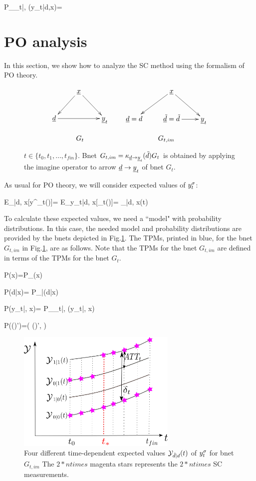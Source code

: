 \beq\color{blue}
P_{\rvy_t|\rvd, \rvx}(y_t|d,x)=
\eeq

\section{PO analysis}
In this section,
we show how
to analyze the
SC method
using the formalism of PO theory.



\begin{figure}[h!]
$$
\begin{array}{ccccc}
\xymatrix{
&\rvx\ar[dl]\ar[dr]
\\
\rvd\ar[rr]&&\rvy_t
}
&&
\xymatrix{
&\rvx\ar[dl]\ar[dr]
\\
\rvd=d&\rvtd=\td\ar[r]&\rvy_t
}
\\
\\
G_t&&G_{t, im}
\end{array}
$$
\caption{$t\in \{t_0, t_1, \ldots, 
t_{fin}\}$.
Bnet 
$G_{t, im}= \kappa_{{\underline{d}}\rightarrow{\underline{y}}_t}
({\tilde{d}})G_t$
is obtained by applying 
the imagine operator to arrow 
${\underline{d}}\rightarrow{\underline{y}}_t$
of bnet $G_t$.}
\label{fig-syn-con-G-im}
\end{figure}

As usual for PO theory,
we will consider
expected values of $y^\sigma_t$:


\beq
E_{\s|d, x}[y^\s_t(\td)]=
 E_{y_t|d, x}[\rvy_t(\td)]=
\caly_{\td|d, x}(t)
\eeq

To calculate these
expected values, we need a ``model"
with probability 
distributions.
In this case,
the needed model and probability
distributions are
provided by the
bnets depicted in Fig.\ref{fig-syn-con-G-im}.
The TPMs,
printed in blue,
for the 
 bnet
$G_{t, im}$
in Fig.\ref{fig-syn-con-G-im},
are as follows.
Note
that the
TPMs for the bnet $G_{t, im}$
are defined in 
terms
of the TPMs for the bnet $G_t$.



\beq\color{blue}
P(x)=P_{\rvx}(x)
\eeq

\beq\color{blue}
P(d|x)= 
P_{\rvd|\rvx}(d|x)
\eeq
 
\beq\color{blue}
P(y_t|\td, x)=
P_{\rvy_t|\rvd, \rvx}
(y_t|\td, x)
\eeq

\beq\color{blue}
P((\td)')=\delta(
(\td)', \td)
\eeq

\begin{figure}[h!]
\centering
\includegraphics[width=3in]
{syn-con/syn-con-bc.png}
\caption{Four different time-dependent
expected 
values ${\cal Y}_{{\tilde{d}}|d}(t)$ of $y^\sigma_t$
for bnet $G_{t, im}$
The $2*ntimes$ magenta  stars
represents the $2*ntimes$ SC measurements.} 
\label{fig-syn-con-bc}
\end{figure}

